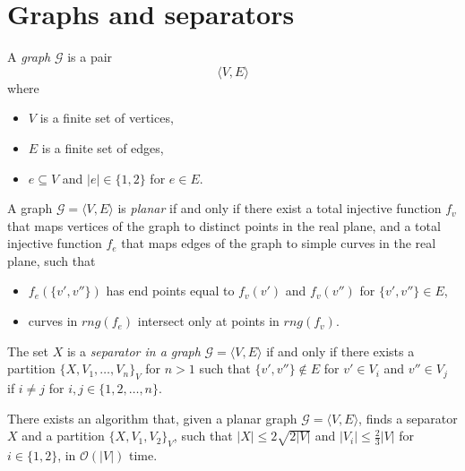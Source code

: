 \section{Graphs and separators}

\begin{definition}
  A \emph{graph} $\mathcal{G}$ is a pair
  \begin{equation*}
    \langle V, E \rangle
  \end{equation*}
  where
  \begin{itemize}
    \item $V$ is a finite set of vertices,
    \item $E$ is a finite set of edges,
    \item $e \subseteq V$ and $|e| \in \{ 1, 2 \}$ for $e \in E$.
  \end{itemize}
\end{definition}

\begin{definition}
  A graph $\mathcal{G} = \langle V, E \rangle$ is \emph{planar} if and only if there
  exist a total injective function $f_v$ that maps vertices of the graph to distinct
  points in the real plane, and a total injective function $f_e$ that maps edges of the
  graph to simple curves in the real plane, such that
  \begin{itemize}
    \item $f_e(\{ v', v'' \})$ has end points equal to $f_v(v')$ and $f_v(v'')$ for
	    $\{ v', v'' \} \in E$,
    \item curves in $rng(f_e)$ intersect only at points in $rng(f_v)$.
  \end{itemize}
\end{definition}

\begin{definition}
  The set $X$ is a \emph{separator in a graph} $\mathcal{G} = \langle V, E \rangle$
  if and only if there exists a partition ${\{ X, V_1, \ldots, V_n \}}_V$ for $n > 1$
  such that $\{ v', v'' \} \not\in E$ for $v' \in V_i$ and $v'' \in V_j$ if $i
  \neq j$ for $i, j \in \{1, 2, \ldots, n \}$.
\end{definition}

\begin{theorem}
  \label{thm:lipton_tarjan}
  There exists an algorithm that, given a planar graph $\mathcal{G} = \langle V, E
  \rangle$, finds a separator $X$ and a partition $\{ X, V_1, V_2 \}_V$, such that
  $|X| \leq 2 \sqrt{2|V|}$ and $|V_i| \leq \frac{2}{3} |V|$ for $i \in \{ 1, 2 \}$,
  in $\mathcal{O}(|V|)$ time.
\end{theorem}
